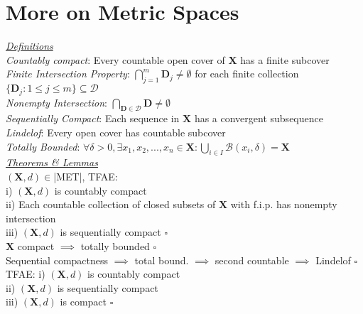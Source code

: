 \section{More on Metric Spaces}
\underline{\emph{Definitions}}\\
\emph{Countably compact}: Every countable open cover of $\mathbf{X}$ has a finite subcover\\
\emph{Finite Intersection Property}: $\bigcap_{j=1}^m\mathbf{D}_j\neq\emptyset$ for each finite collection $\{\mathbf{D}_j:1\leq j\leq m\}\subseteq\mathcal{D}$\\
\emph{Nonempty Intersection}: $\bigcap\limits_{\mathbf{D}\in\mathcal{D}}\mathbf{D}\neq\emptyset$\\
\emph{Sequentially Compact}: Each sequence in $\mathbf{X}$ has a convergent subsequence\\
\emph{Lindelof}: Every open cover has countable subcover\\
\emph{Totally Bounded}: $\forall\delta>0,\exists x_1,x_2,...,x_n\in\mathbf{X}:\bigcup\limits_{i\in I}\mathcal{B}(x_i,\delta)=\mathbf{X}$
\\\underline{\emph{Theorems \& Lemmas}}\\
$(\mathbf{X},d)\in$|MET|, TFAE:\\
i) $(\mathbf{X},d)$ is countably compact\\
ii) Each countable collection of closed subsets of $\mathbf{X}$ with f.i.p. has nonempty intersection\\
iii) $(\mathbf{X},d)$ is sequentially compact $\square$\\
$\mathbf{X}$ compact $\implies$ totally bounded $\square$\\
Sequential compactness $\implies$ total bound. $\implies$ second countable $\implies$ Lindelof $\square$\\
TFAE: i) $(\mathbf{X},d)$ is countably compact\\
ii) $(\mathbf{X},d)$ is sequentially compact\\
iii) $(\mathbf{X},d)$ is compact $\square$
